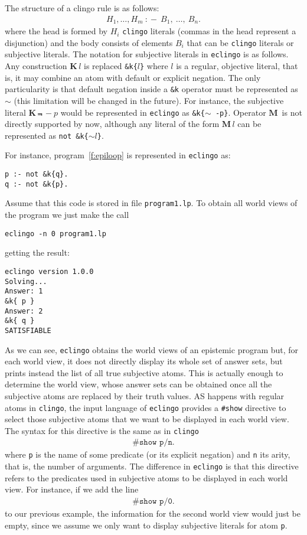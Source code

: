 \documentclass{new_tlp}
\def\K{\mathbf{K}\, }
\def\M{\mathbf{M}\, }
\def\eclingo{{\tt eclingo}}
\def\clingo{{\tt clingo}}
\begin{document}
The structure of a clingo rule is as follows:
\begin{align*}
    H_1,\dots,H_m \ \mathtt{:\!-} \ B_1,\ \dots ,\ B_n.
\end{align*}
where the head is formed by $H_i$ \clingo{} literals (commas in the head represent a disjunction) and the body consists of elements $B_i$ that can be \clingo{} literals or subjective literals.
%
The notation for subjective literals in \eclingo{} is as follows.
%
Any construction $\K l$ is replaced {\tt \&k\{$l$\}} where $l$ is a regular, objective literal, that is, it may combine an atom with default or explicit negation.
%
The only particularity is that default negation inside a {\tt \&k} operator must be represented as $\sim$ (this limitation will be changed in the future).
%
For instance, the subjective literal $\K \Not \, -p$ would be represented in \eclingo{} as \mbox{\tt \&k\{$\sim$ -p\}}.
%
Operator $\M$ is not directly supported by now, although any literal of the form $\M l$ can be represented as {\tt not \&k\{$\sim l$\}}.

For instance, program~\eqref{f:epiloop} is represented in \eclingo{} as:
\begin{Verbatim}[frame=single]
p :- not &k{q}.
q :- not &k{p}.
\end{Verbatim}

Assume that this code is stored in file {\tt program1.lp}.
%
To obtain all world views of the program we just make the call
\begin{verbatim}
eclingo -n 0 program1.lp
\end{verbatim}
getting the result:
\begin{Verbatim}[frame=single]
eclingo version 1.0.0
Solving...
Answer: 1
&k{ p }
Answer: 2
&k{ q }
SATISFIABLE
\end{Verbatim}
As we can see, \eclingo{} obtains the world views of an epistemic program but, for each world view, it does not directly display its whole set of answer sets, but prints instead the list of all true subjective atoms.
%
This is actually enough to determine the world view, whose answer sets can be obtained once all the subjective atoms are replaced by their truth values.
%
AS happens with regular atoms in \clingo{}, the input language of  \eclingo{} provides a {\tt \#show} directive to select those subjective atoms that we want to be displayed in each world view.
%
The syntax for this directive is the same as in \clingo{}
\begin{align*}
    \texttt{\#show p/n.}
\end{align*}
where {\tt p} is the name of some predicate (or its explicit negation) and {\tt n} its arity, that is, the number of arguments.
%
The difference in \eclingo{} is that this directive refers to the predicates used in subjective atoms to be displayed in each world view.
For instance, if we add the line
\begin{align*}
    \texttt{\#show p/0.}
\end{align*}
to our previous example, the information for the second world view would just be empty, since we assume we only want to display subjective literals for atom {\tt p}.
\end{document}
